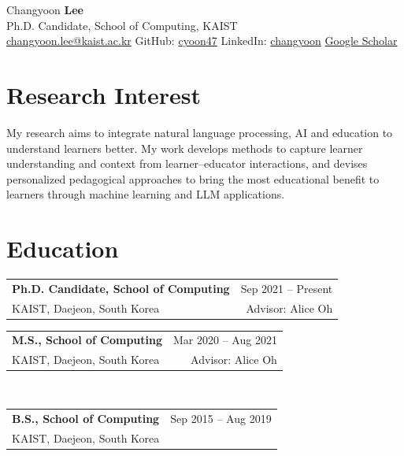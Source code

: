 \documentclass[11pt,a4paper]{article}
\makeatletter
\newcommand{\entry}[4]{%
  \begin{tabularx}{\linewidth}{@{}Xr@{}}
    \textbf{#1} & {\color{soft}\sans\small #3}\\
    {\color{soft}#2} & {\color{soft}\sans\small #4}\\
  \end{tabularx}\vspace{0.2em}%
}
\makeatother
\begin{document}
{\sans\Huge\color{ink}Changyoon \textbf{Lee}}\\[0.3em]
{\sans\color{soft}Ph.D. Candidate, School of Computing, KAIST}\\[0.5em]
{\small\sans
\href{mailto:changyoon.lee@kaist.ac.kr}{changyoon.lee@kaist.ac.kr} \quad\textbar\quad
GitHub: \href{https://github.com/cyoon47}{cyoon47} \quad\textbar\quad
LinkedIn: \href{https://www.linkedin.com/in/changyoon}{changyoon} \quad\textbar\quad
\href{https://scholar.google.com/citations?user=iDriue4AAAAJ}{Google Scholar}
}

\section{Research Interest}
My research aims to integrate natural language processing, AI and education to understand learners better. My work develops methods to capture learner understanding and context from learner--educator interactions, and devises personalized pedagogical approaches to bring the most educational benefit to learners through machine learning and LLM applications.

\section{Education}
\entry{Ph.D. Candidate, School of Computing}{KAIST, Daejeon, South Korea}{Sep 2021 -- Present}{Advisor: Alice Oh}
\entry{M.S., School of Computing}{KAIST, Daejeon, South Korea}{Mar 2020 -- Aug 2021}{Advisor: Alice Oh}
\\[0.4em]
\entry{B.S., School of Computing}{KAIST, Daejeon, South Korea}{Sep 2015 -- Aug 2019}{}
\end{document}
